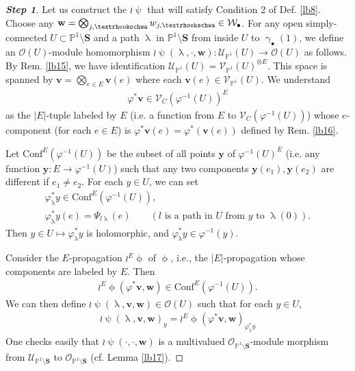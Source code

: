 \documentclass[12pt,a4paper,notitlepage]{article}
\theoremstyle{definition}
\theoremstyle{plain}
\newcommand{\mc}{\mathcal}
\newcommand{\Conf}{\mathrm{Conf}}
\newcommand{\scr}{\mathscr}
\newcommand{\mbf}{\mathbf}
\newcommand{\blt}{\bullet}
\newcommand{\Pbb}{\mathbb P}
\newcommand{\Sbf}{\mathbf{S}}
\newcommand{\vbf}{\mathbf v}
\newcommand{\wbf}{\mathbf w}
\newcommand{\tipae}{\text{\textrhookschwa}}
\numberwithin{equation}{subsection}
\begin{document}
\begin{proof}[\textbf{Step 1}] Let us construct the $\wr\uppsi$ that will satisfy Condition 2 of Def. \ref{lb8}. Choose any $\wbf=\bigotimes_{j,\tipae}w_{j,\tipae}\in \mc W_\blt$. For any open simply-connected $U\subset\Pbb^1\setminus\Sbf$ and a path $\uplambda$ in $\Pbb^1\setminus\Sbf$ from inside $U$ to $\upgamma_\blt(1)$, we define an $\scr O(U)$-module homomorphism $\wr\uppsi(\uplambda,\cdot,\wbf):\scr U_{\Pbb^1}(U)\rightarrow\scr O(U)$ as follows. By Rem. \ref{lb15}, we have identification $\scr U_{\Pbb^1}(U)=\scr V_{\Pbb^1}(U)^{\otimes E}$. This space is spanned by $\vbf=\bigotimes_{e\in E}\vbf(e)$ where each $\vbf(e)\in\scr V_{\Pbb^1}(U)$. We understand
\begin{align*}
	\varphi^*\vbf\in \scr V_C(\varphi^{-1}(U))^E	
\end{align*}
as the $|E|$-tuple labeled by $E$ (i.e. a function from $E$ to $\scr V_C(\varphi^{-1}(U))$) whose $e$-component (for each $e\in E$) is $\varphi^*\vbf(e)=\varphi^*(\vbf(e))$ defined by Rem. \ref{lb16}. 


Let $\Conf^E(\varphi^{-1}(U))$ be the subset of all points $\mbf y$ of $\varphi^{-1}(U)^E$ (i.e. any function $\mbf y:E\rightarrow \varphi^{-1}(U)$) such that any two components $\mbf y(e_1),\mbf y(e_2)$ are different if $e_1\neq e_2$. For each $y\in U$, we can set 
\begin{gather}
\varphi_\uplambda^*y\in\Conf^E(\varphi^{-1}(U)),\nonumber\\
\varphi_\uplambda^*y(e)=\Psi_{l\uplambda}(e)\qquad (\text{$l$ is a path in $U$ from $y$ to $\uplambda(0)$}).	\label{eq27}
\end{gather}
Then  $y\in U\mapsto\varphi_{\uplambda}^*y$ is holomorphic, and $\varphi_\uplambda^*y\in\varphi^{-1}(y)$.


Consider the $E$-propagation $\wr^E\upphi$ of $\upphi$, i.e., the $|E|$-propagation whose components are labeled by $E$. Then
\begin{align*}
\wr^E\upphi(\varphi^*\vbf,\wbf)\in\Conf^E(\varphi^{-1}(U)).	
\end{align*}
We can then define $\wr\uppsi(\uplambda,\vbf,\wbf)\in\scr O(U)$ such that for each $y\in U$,
\begin{gather}
\boxed{~\wr\uppsi(\uplambda,\vbf,\wbf)_y=\wr^E\upphi(\varphi^*\vbf,\wbf)_{\varphi_\uplambda^*y}~}\label{eq3}
\end{gather}
One checks easily that $\wr\uppsi(\cdot,\cdot,\wbf)$ is a multivalued $\scr O_{\Pbb^1\setminus\Sbf}$-module morphism from $\scr U_{\Pbb^1\setminus\Sbf}$ to $\scr O_{\Pbb^1\setminus\Sbf}$ (cf. Lemma \ref{lb17}).


\end{proof}
\end{document}
